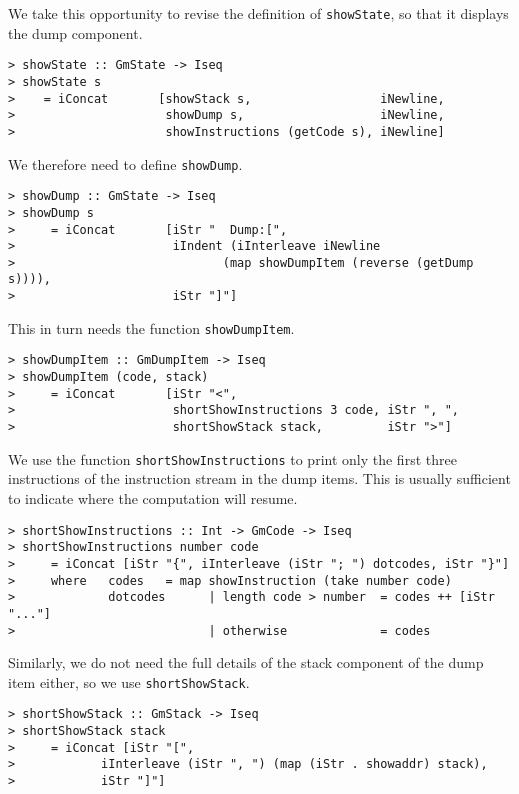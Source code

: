 We take this opportunity to revise the definition of \mbox{\tt showState}, so
that it displays the dump component.
\begin{verbatim}
> showState :: GmState -> Iseq
> showState s
>    = iConcat       [showStack s,                  iNewline,
>                     showDump s,                   iNewline,
>                     showInstructions (getCode s), iNewline]
\end{verbatim}
%
%
We therefore need to define \mbox{\tt showDump}.
\begin{verbatim}
> showDump :: GmState -> Iseq
> showDump s
>     = iConcat       [iStr "  Dump:[",
>                      iIndent (iInterleave iNewline
>                             (map showDumpItem (reverse (getDump s)))),
>                      iStr "]"]
\end{verbatim}
%
%
This in turn needs the function \mbox{\tt showDumpItem}.
\begin{verbatim}
> showDumpItem :: GmDumpItem -> Iseq
> showDumpItem (code, stack)
>     = iConcat       [iStr "<",
>                      shortShowInstructions 3 code, iStr ", ",
>                      shortShowStack stack,         iStr ">"]
\end{verbatim}
%
%
\par
We use the function \mbox{\tt shortShowInstructions} to print only the
first three instructions of the instruction stream in the dump items.
This is usually sufficient to indicate where the computation will
resume.
\begin{verbatim}
> shortShowInstructions :: Int -> GmCode -> Iseq
> shortShowInstructions number code
>     = iConcat [iStr "{", iInterleave (iStr "; ") dotcodes, iStr "}"]
>     where   codes   = map showInstruction (take number code)
>             dotcodes      | length code > number  = codes ++ [iStr "..."]
>                           | otherwise             = codes
\end{verbatim}
%
%
Similarly, we do not need the full details of the stack component of
the dump item either, so we use \mbox{\tt shortShowStack}.
\begin{verbatim}
> shortShowStack :: GmStack -> Iseq
> shortShowStack stack
>     = iConcat [iStr "[",
>            iInterleave (iStr ", ") (map (iStr . showaddr) stack),
>            iStr "]"]
\end{verbatim}
%
%
